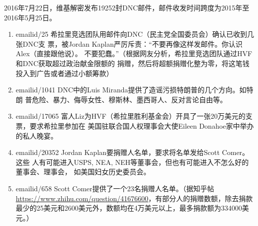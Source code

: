 2016年7月22日，维基解密发布19252封DNC邮件，邮件收发时间跨度为2015年至2016年5月25日。
\begin{enumerate}
  \item emailid/25 希拉里竞选团队用邮件向DNC（民主党全国委员会）确认已收到几张DNC支
    票，被Jordan Kaplan严厉斥责：“不要再像这样发邮件。你认识Alex（直接跟他说）。
    不要犯蠢。”（根据网友分析，希拉里竞选团队通过HVF和DNC获取超过政治献金限额的
    捐赠，然后将超额捐赠化整为零，将这笔钱投入到广告或者通过小额筹款）
    
    \item emailid/1041 DNC中的Luis Miranda提供了造谣污损特朗普的几个方向。如特朗
      普危险、暴力、侮辱女性、穆斯林、墨西哥人、反对言论自由等。

      \item emailid/17065 富人Liz为HVF（希拉里胜利基金会）开具了一张20万美元的支票，要求希拉里参加在
        美国驻联合国人权理事会大使Eileen Donahoe家中举办的私人晚宴。
        
  \item emailid/20352 Jordan Kaplan要捐赠人名单，要求将名单发给Scott Comer。这些
    人有可能进入USPS, NEA, NEH等董事会，但也有可能进入不怎么好的董事会、理事会，
    如美国妇女历史委员会。

  \item emailid/658 Scott Comer提供了一个23名捐赠人名单。（据知乎帖 \url{https://www.zhihu.com/question/41676600}，有部分人的捐赠数额，除去捐款最少的25美元和2600美元外，数额均在4万美元以上，最多捐款额为334000美元。）
\end{enumerate}

